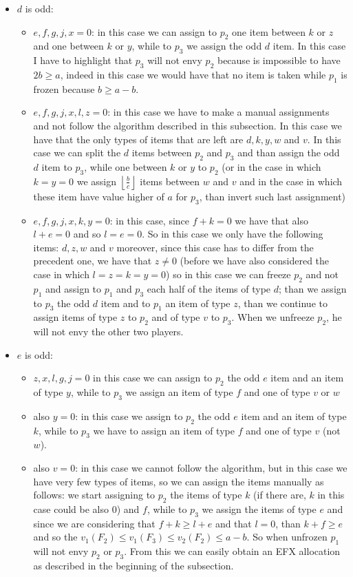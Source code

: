 \documentclass{article}
\newcommand{\floor}[3][2]{\left \lfloor\frac{#2}{#3}\right \rfloor}
\begin{document}
\begin{itemize}
    \item $d$ is odd: \begin{itemize}
        \item $e,f,g,j,x=0$: in this case we can assign to $p_2$ one item between $k$ or $z$ and one between $k$ or $y$, while to $p_3$ we assign the odd $d$ item. In this case I have to highlight that $p_3$ will not envy $p_2$ because is impossible to have $2b\ge a$, indeed in this case we would have that no item is taken while $p_1$ is frozen because $b\ge a-b$.
        \item $e,f,g,j,x, l, z=0$: in this case we have to make a manual assignments and not follow the algorithm described in this subsection. In this case we have that the only types of items that are left are $d,k,y,w$ and $v$. In this case we can split the $d$ items between $p_2$ and $p_3$ and than assign the odd $d$ item to $p_3$, while one between $k$ or $y$ to $p_2$ (or in the case in which $k=y=0$ we assign $\floor{b}{c}$ items between $w$ and $v$ and in the case in which these item have value higher of $a$ for $p_3$, than invert such last assignment)
        \item $e,f,g,j,x,k,y=0$: in this case, since $f+k=0$ we have that also $l+e=0$ and so $l=e=0$. So in this case we only have the following items: $d,z,w$ and $v$ moreover, since this case has to differ from the precedent one, we have that $z\ne 0$ (before we have also considered the case in which $l=z=k=y=0$) so in this case we can freeze $p_2$ and not $p_1$ and assign to $p_1$ and $p_3$ each half of the items of type $d$; than we assign to $p_3$ the odd $d$ item and to $p_1$ an item of type $z$, than we continue to assign items of type $z$ to $p_2$ and of type $v$ to $p_3$. When we unfreeze $p_2$, he will not envy the other two players.
    \end{itemize}
    \item $e$ is odd:
    \begin{itemize}
        \item $z,x,l,g,j=0$ in this case we can assign to $p_2$ the odd $e$ item and an item of type $y$, while to $p_3$ we assign an item of type $f$ and one of type $v$ or $w$
        \item also $y=0$: in this case we assign to $p_2$ the odd $e$ item and an item of type $k$, while to $p_3$ we have to assign an item of type $f$ and one of type $v$ (not $w$).
        \item also $v = 0$: in this case we cannot follow the algorithm, but in this case we have very few types of items, so we can assign the items manually as follows: we start assigning to $p_2$ the items of type $k$ (if there are, $k$ in this case could be also $0$) and $f$, while to $p_3$ we assign the items of type $e$ and since we are considering that $f+k\ge l+e$ and that $l=0$, than $k+f\ge e$ and so the $v_1(F_2)\le v_1(F_3) \le v_2(F_2)\le a-b$. So when unfrozen $p_1$ will not envy $p_2$ or $p_3$. From this we can easily obtain an EFX allocation as described in the beginning of the subsection. 

\end{itemize}
\end{itemize}
\end{document}
